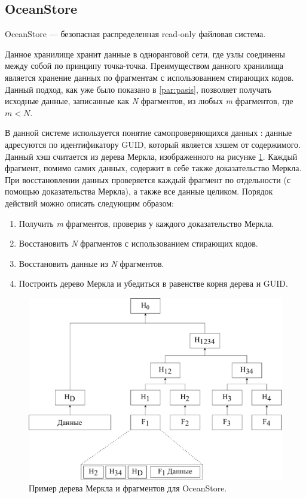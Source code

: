 \subsection{OceanStore}
\label{par:ocean}

OceanStore \cite{ocean} --- безопасная распределенная read-only файловая система.

Данное хранилище хранит данные в одноранговой сети, где узлы соединены между собой по принципу точка-точка. Преимуществом данного хранилища является хранение данных по фрагментам с использованием стирающих кодов. Данный подход, как уже было показано в \ref{par:pasis}, позволяет получать исходные данные, записанные как \textit{N} фрагментов, из любых \textit{m} фрагментов, где $m < N$.

В данной системе используется понятие самопроверяющихся данных \cite{selfverify}: данные адресуются по идентификатору GUID, который является хэшем от содержимого. Данный хэш считается из дерева Меркла, изображенного на рисунке \ref{fig:ocean}. Каждый фрагмент, помимо самих данных, содержит в себе также доказательство Меркла. При восстановлении данных проверяется каждый фрагмент по отдельности (с помощью доказательства Меркла), а также все данные целиком. Порядок действий можно описать следующим образом:
\begin{enumerate}
    \item Получить \textit{m} фрагментов, проверив у каждого доказательство Меркла.
    \item Восстановить \textit{N} фрагментов с использованием стирающих кодов.
    \item Восстановить данные из \textit{N} фрагментов. %
    \item Построить дерево Меркла и убедиться в равенстве корня дерева и GUID.
\end{enumerate}

\begin{figure}[hbtp]
    \centering
    \includegraphics[width=\textwidth]{img/ocean.pdf}
    \caption{Пример дерева Меркла и фрагментов для OceanStore.}
    \label{fig:ocean}
\end{figure}

